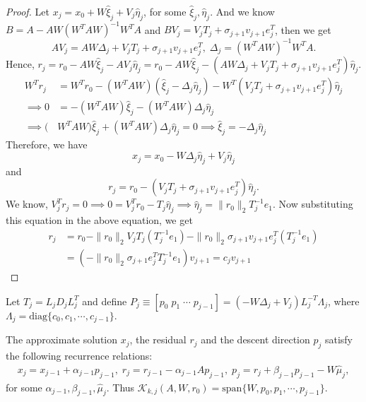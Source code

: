 \documentclass[10pt,a4paper]{article}
\begin{document}
\begin{proof}
Let $x_j=x_0+W\hat{\xi}_j+V_j\hat{\eta}_j$, for some $\hat{\xi}_j, \hat{\eta}_j.$ And we know $B=A-AW(W^TAW)^{-1}W^TA$ and $BV_j=V_jT_j+\sigma_{j+1}v_{j+1}e^T_j$, then we get $$AV_j=AW\Delta_j+V_jT_j+\sigma_{j+1}v_{j+1}e^T_j, \;\Delta_j=(W^TAW)^{-1}W^TA.$$
Hence, $r_j = r_0-AW\hat{\xi}_j-AV_j\hat{\eta}_j = r_0-AW\hat{\xi}_j-(AW\Delta_j+V_jT_j+\sigma_{j+1}v_{j+1}e^T_j)\hat{\eta}_j.$
\begin{align*}
W^Tr_j &= W^Tr_0-(W^TAW)(\hat{\xi}_j-\Delta_j\hat{\eta}_j)-W^T(V_jT_j+\sigma_{j+1}v_{j+1}e^T_j)\hat{\eta}_j \\
\implies 0 &= -(W^TAW)\hat{\xi}_j - (W^TAW)\Delta_j\hat{\eta}_j \\
\implies (&W^TAW)\hat{\xi}_j + (W^TAW)\Delta_j\hat{\eta}_j = 0 \implies \hat{\xi}_j = -\Delta_j\hat{\eta}_j
\end{align*}
Therefore, we have $$x_j = x_0-W\Delta_j\hat{\eta}_j+V_j\hat{\eta}_j$$ and $$r_j = r_0-(V_jT_j+\sigma_{j+1}v_{j+1}e^T_j)\hat{\eta}_j.$$
We know, $V_j^Tr_j=0\implies 0 = V_j^Tr_0-T_j\hat{\eta}_j\implies \hat{\eta}_j = \|r_0\|_2T^{-1}_je_1$. Now substituting this equation in the above equation, we get
\begin{align*}
r_j &= r_0-\|r_0\|_2V_jT_j(T^{-1}_je_1)-\|r_0\|_2\sigma_{j+1}v_{j+1}e^T_j(T^{-1}_je_1) \\
 &= (-\|r_0\|_2\sigma_{j+1}e^T_jT^{-1}_je_1)v_{j+1} = c_jv_{j+1}
\end{align*}
\end{proof}

Let $T_j=L_jD_jL^T_j$ and define $P_j\equiv [p_0\;p_1\;\cdots\;p_{j-1}]=(-W\Delta_j+V_j)L^{-T}_j\Lambda_j$, where $\Lambda_j=\text{diag}\{c_0,c_1,\cdots,c_{j-1}\}.$

\begin{proposition}
The approximate solution $x_j$, the residual $r_j$ and the descent direction $p_j$ satisfy the following recurrence relations:
\begin{align*}
x_j=x_{j-1}+\alpha_{j-1}p_{j-1},\;r_j=r_{j-1}-\alpha_{j-1}Ap_{j-1},\;p_j=r_j+\beta_{j-1}p_{j-1}-W\hat{\mu}_j,
\end{align*}
for some $\alpha_{j-1},\beta_{j-1},\hat{\mu}_j.$ Thus $\mathcal{K}_{k,j}(A,W,r_0)=\text{span}\{W,p_0,p_1,\cdots,p_{j-1}\}$.
\end{proposition}
\end{document}
